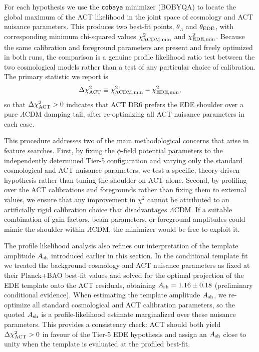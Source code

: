 \documentclass[a4paper,11pt]{article}
\begin{document}
For each hypothesis we use the \texttt{cobaya} minimizer (BOBYQA) to locate the global maximum of the ACT likelihood in the joint space of cosmology and ACT nuisance parameters. This produces two best-fit points, $\theta_{\Lambda}$ and $\theta_{\rm EDE}$, with corresponding minimum chi-squared values $\chi^2_{\Lambda{\rm CDM,min}}$ and $\chi^2_{{\rm EDE,min}}$. Because the same calibration and foreground parameters are present and freely optimized in both runs, the comparison is a genuine profile likelihood ratio test between the two cosmological models rather than a test of any particular choice of calibration. The primary statistic we report is
\begin{equation}
\Delta \chi^2_{\rm ACT}
\equiv
\chi^2_{\Lambda{\rm CDM,min}} - \chi^2_{{\rm EDE,min}},
\end{equation}
so that $\Delta \chi^2_{\rm ACT} > 0$ indicates that ACT DR6 prefers the EDE shoulder over a pure $\Lambda$CDM damping tail, after re-optimizing all ACT nuisance parameters in each case.

This procedure addresses two of the main methodological concerns that arise in feature searches. First, by fixing the $\phi$-field potential parameters to the independently determined Tier-5 configuration and varying only the standard cosmological and ACT nuisance parameters, we test a specific, theory-driven hypothesis rather than tuning the shoulder on ACT alone. Second, by profiling over the ACT calibrations and foregrounds rather than fixing them to external values, we ensure that any improvement in $\chi^2$ cannot be attributed to an artificially rigid calibration choice that disadvantages $\Lambda$CDM. If a suitable combination of gain factors, beam parameters, or foreground amplitudes could mimic the shoulder within $\Lambda$CDM, the minimizer would be free to exploit it.

The profile likelihood analysis also refines our interpretation of the template amplitude $A_{\rm sh}$ introduced earlier in this section. In the conditional template fit we treated the background cosmology and ACT nuisance parameters as fixed at their Planck+BAO best-fit values and solved for the optimal projection of the EDE template onto the ACT residuals, obtaining $A_{\rm sh}=1.16\pm0.18$ (preliminary conditional evidence). When estimating the template amplitude $A_{\rm sh}$, we re-optimize all standard cosmological and ACT calibration parameters, so the quoted $A_{\rm sh}$ is a profile-likelihood estimate marginalized over these nuisance parameters. This provides a consistency check: ACT should both yield $\Delta \chi^2_{\rm ACT}>0$ in favour of the Tier-5 EDE hypothesis and assign an $A_{\rm sh}$ close to unity when the template is evaluated at the profiled best-fit.
\end{document}
